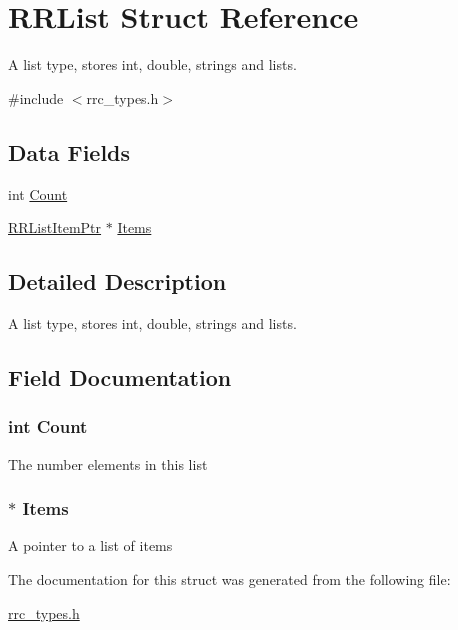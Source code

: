 \hypertarget{struct_r_r_list}{\section{R\-R\-List Struct Reference}
\label{struct_r_r_list}
}


A list type, stores int, double, strings and lists.  




{\ttfamily \#include $<$rrc\-\_\-types.\-h$>$}

\subsection*{Data Fields}
\begin{DoxyCompactItemize}
\item 
int \hyperlink{struct_r_r_list_aad462966ed963f892117056de1eba502}{Count}
\item 
\hyperlink{rrc__types_8h_a79938364b69256c42480bb3a29ebf73e}{R\-R\-List\-Item\-Ptr} $\ast$ \hyperlink{struct_r_r_list_ada0586e0d2f92ef7b364486c9e989fcf}{Items}
\end{DoxyCompactItemize}


\subsection{Detailed Description}
A list type, stores int, double, strings and lists. 

\subsection{Field Documentation}
\hypertarget{struct_r_r_list_aad462966ed963f892117056de1eba502}{
\subsubsection[{Count}]{\setlength{\rightskip}{0pt plus 5cm}int Count}}\label{struct_r_r_list_aad462966ed963f892117056de1eba502}
The number elements in this list \hypertarget{struct_r_r_list_ada0586e0d2f92ef7b364486c9e989fcf}{
\subsubsection[{Items}]{$\ast$ Items}}\label{struct_r_r_list_ada0586e0d2f92ef7b364486c9e989fcf}
A pointer to a list of items 

The documentation for this struct was generated from the following file\-:\begin{DoxyCompactItemize}
\item 
\hyperlink{rrc__types_8h}{rrc\-\_\-types.\-h}\end{DoxyCompactItemize}
